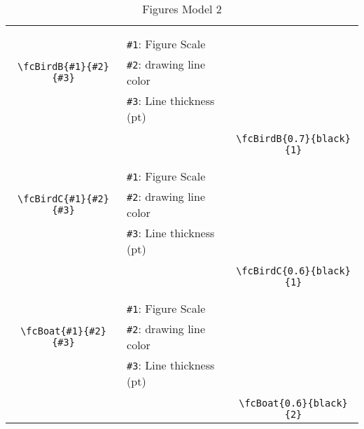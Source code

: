 \documentclass{article}
\begin{document}
\begin{table}[H]
\begin{tabular}{|c|l|c|}
	&&\multirow{5}{*}{\fcBirdB{0.7}{black}{1}}\\	&&\\	&\verb|#1|: Figure Scale &\\	\verb|\fcBirdB{#1}{#2}{#3}|&	\verb|#2|: drawing line color &\\	&\verb|#3|: Line thickness (pt) &\\ &&\\&&	\verb|\fcBirdB{0.7}{black}{1}|\\\hline 	
	&&\multirow{5}{*}{\fcBirdC{0.6}{black}{1}}\\	&&\\	&\verb|#1|: Figure Scale &\\	\verb|\fcBirdC{#1}{#2}{#3}|&	\verb|#2|: drawing line color &\\	&\verb|#3|: Line thickness (pt) &\\ &&\\&&	\verb|\fcBirdC{0.6}{black}{1}|\\\hline 	
	&&\multirow{5}{*}{\fcBoat{0.6}{black}{2}}\\	&&\\	&\verb|#1|: Figure Scale &\\	\verb|\fcBoat{#1}{#2}{#3}|&	\verb|#2|: drawing line color &\\	&\verb|#3|: Line thickness (pt) &\\ &&\\&&	\verb|\fcBoat{0.6}{black}{2}|\\\hline 	\hline\end{tabular}\caption{Figures Model 2}\label{tab2}\end{table}
\end{document}
